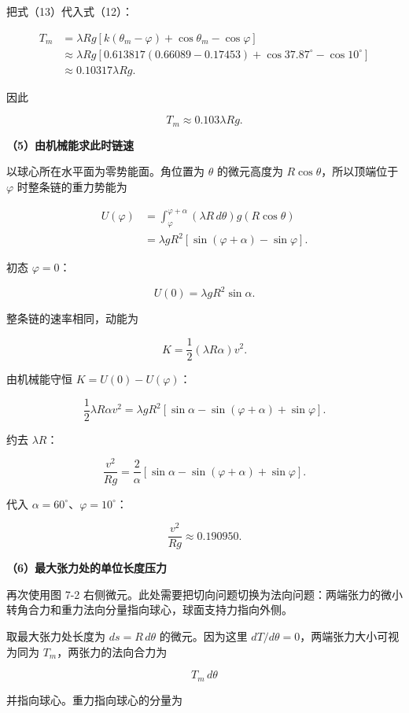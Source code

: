 \documentclass[12pt,a4paper,UTF8]{ctexart}
\begin{document}
把式（13）代入式（12）：

\[
\begin{aligned}
T_m
&=\lambda Rg
\left[k(\theta_m-\varphi)+\cos\theta_m-\cos\varphi\right]\\
&\approx\lambda Rg
\left[0.613817(0.66089-0.17453)
+\cos37.87^\circ-\cos10^\circ\right]\\
&\approx0.10317\lambda Rg.
\end{aligned}
\]

因此

\[
\boxed{T_m\approx0.103\lambda Rg}.
\tag{14}
\]

\textbf{（5）由机械能求此时链速}

以球心所在水平面为零势能面。角位置为 \(\theta\) 的微元高度为
\(R\cos\theta\)，所以顶端位于 \(\varphi\) 时整条链的重力势能为

\[
\begin{aligned}
U(\varphi)
&=\int_\varphi^{\varphi+\alpha}
(\lambda R\,d\theta)g(R\cos\theta)\\
&=\lambda gR^2
[\sin(\varphi+\alpha)-\sin\varphi].
\end{aligned}
\tag{15}
\]

初态 \(\varphi=0\)：

\[
U(0)=\lambda gR^2\sin\alpha.
\]

整条链的速率相同，动能为

\[
K=\frac12(\lambda R\alpha)v^2.
\]

由机械能守恒 \(K=U(0)-U(\varphi)\)：

\[
\frac12\lambda R\alpha v^2
=\lambda gR^2
[\sin\alpha-\sin(\varphi+\alpha)+\sin\varphi].
\]

约去 \(\lambda R\)：

\[
\boxed{
\frac{v^2}{Rg}
=\frac2\alpha
[\sin\alpha-\sin(\varphi+\alpha)+\sin\varphi]
}.
\tag{16}
\]

代入 \(\alpha=60^\circ\)、\(\varphi=10^\circ\)：

\[
\frac{v^2}{Rg}\approx0.190950.
\tag{17}
\]

\textbf{（6）最大张力处的单位长度压力}

再次使用图 7-2
右侧微元。此处需要把切向问题切换为法向问题：两端张力的微小转角合力和重力法向分量指向球心，球面支持力指向外侧。

取最大张力处长度为 \(ds=R\,d\theta\) 的微元。因为这里
\(dT/d\theta=0\)，两端张力大小可视为同为 \(T_m\)，两张力的法向合力为

\[
T_m\,d\theta
\]

并指向球心。重力指向球心的分量为
\end{document}
